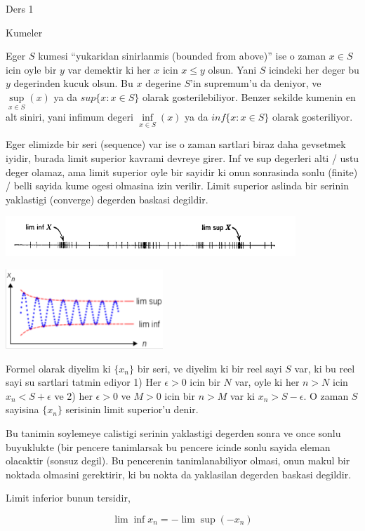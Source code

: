 \documentclass[12pt,fleqn]{article}
\begin{document}
Ders 1 

Kumeler 

Eger $S$ kumesi ``yukaridan sinirlanmis (bounded from above)'' ise o zaman
$x \in S$ icin oyle bir $y$ var demektir ki her $x$ icin $x \le y$
olsun. Yani $S$ icindeki her deger bu $y$ degerinden kucuk olsun. Bu $x$
degerine $S$'in supremum'u da deniyor, ve $\sup\limits_{x \in S}(x)$ ya da
$sup\{x:x \in S\}$ olarak gosterilebiliyor. Benzer sekilde kumenin en alt
siniri, yani infimum degeri $\inf\limits_{x \in S}(x)$ ya da $inf\{x:x \in
S\}$ olarak gosteriliyor. 

Eger elimizde bir seri (sequence) var ise o zaman sartlari biraz daha
gevsetmek iyidir, burada limit superior kavrami devreye girer. Inf ve sup
degerleri alti / ustu deger olamaz, ama limit superior oyle bir sayidir ki
onun sonrasinda sonlu (finite) / belli sayida kume ogesi olmasina izin
verilir. Limit superior aslinda bir serinin yaklastigi (converge) degerden
baskasi degildir. 

\includegraphics[height=1.5cm]{1_01.png}

\includegraphics[height=3cm]{1_02.png}

Formel olarak diyelim ki $\{x_n\}$ bir seri, ve diyelim ki bir reel
sayi $S$ var, ki bu reel sayi su sartlari tatmin ediyor 
1) Her $\epsilon > 0$ icin bir $N$ var, oyle ki her $n>N$ icin $x_n
< S + \epsilon$ 
ve 2) her $\epsilon > 0$ ve $M>0$ icin bir  $n>M$ var ki $x_n
> S - \epsilon$. O 
zaman $S$ sayisina  $\{x_n\}$ serisinin limit superior'u denir. 

Bu tanimin soylemeye calistigi serinin yaklastigi degerden sonra ve once
sonlu buyuklukte (bir pencere tanimlarsak bu pencere icinde sonlu sayida
eleman olacaktir (sonsuz degil). Bu pencerenin tanimlanabiliyor olmasi,
onun makul bir noktada olmasini gerektirir, ki bu nokta da yaklasilan
degerden baskasi degildir. 

Limit inferior bunun tersidir, 

\[ \lim \inf x_n  = -\lim \sup(-x_n)\]
\end{document}
